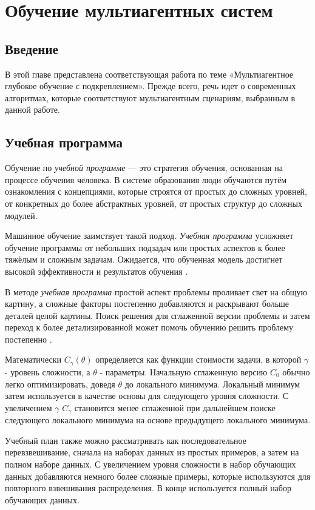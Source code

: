 \chapter{Обучение мультиагентных систем} \label{ch2}


\section{Введение} \label{ch2:intro}

В этой главе представлена соответствующая работа по теме «Мультиагентное глубокое обучение с подкреплением». Прежде всего, речь идет о современных алгоритмах, которые соответствуют мультиагентным сценариям, выбранным в данной работе.





\section{Учебная программа}

Обучение по \textit{учебной программе} — это стратегия обучения, основанная на процессе обучения человека. В системе образования люди обучаются путём ознакомления с концепциями, которые строятся от простых до сложных уровней, от конкретных до более абстрактных уровней, от простых структур до сложных модулей.

Машинное обучение заимствует такой подход. \textit{Учебная программа} усложняет обучение программы от небольших подзадач или простых аспектов к более тяжёлым и сложным задачам. Ожидается, что обученная модель достигнет высокой эффективности и результатов обучения \cite{10.5555/3171837.3172051}.

В методе \textit{учебная программа} простой аспект проблемы проливает свет на общую картину, а сложные факторы постепенно добавляются и раскрывают больше деталей целой картины. Поиск решения для сглаженной версии проблемы и затем переход к более детализированной может помочь обучению решить проблему постепенно \cite{graves2017automated}.

Математически $C_\gamma (\theta)$ определяется как функции стоимости задачи, в которой $\gamma$ - уровень сложности, а $\theta$ - параметры. Начальную сглаженную версию $C_0$ обычно легко оптимизировать, доведя $\theta$ до локального минимума. Локальный минимум затем используется в качестве основы для следующего уровня сложности. С увеличением $\gamma$ $C_\gamma$ становится менее сглаженной при дальнейшем поиске следующего локального минимума на основе предыдущего локального минимума. \cite{10.1145/1553374.1553380}

Учебный план также можно рассматривать как последовательное перевзвешивание, сначала на наборах данных из простых примеров, а затем на полном наборе данных. С увеличением уровня сложности в набор обучающих данных добавляются немного более сложные примеры, которые используются для повторного взвешивания распределения. В конце используется полный набор обучающих данных. \cite{10.1145/1553374.1553380}

\newpage %
